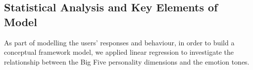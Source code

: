 \documentclass[graybox]{svmult}
\begin{document}
{%

\subsection{Statistical Analysis and Key Elements of Model}

As part of modelling the users' responses and behaviour, in order to
build a conceptual framework model, we applied linear regression to
investigate the relationship between the Big Five personality
dimensions and the emotion tones.


}
\end{document}
